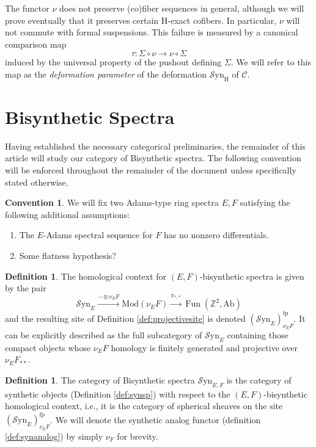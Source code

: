 \documentclass[10pt]{amsart}
\theoremstyle{definition}
\numberwithin{figure}{section}
\numberwithin{equation}{section}
\newtheorem{definition}[figure]{Definition}
\newtheorem{convention}[figure]{Convention}
\newcommand{\cC}{\mathcal{C}}
\theoremstyle{cited}
\newcommand{\bZ}{\mathbb{Z}}
\newcommand{\Fun}{\operatorname{Fun}}
\newcommand{\Ab}{\mathrm{Ab}}
\newcommand{\Mod}{\mathrm{Mod}}
\newcommand{\fp}{\mathrm{fp}}
\newcommand{\Syn}{\mathcal{S}\mathrm{yn}}
\renewcommand{\H}{\mathrm{H}}
\begin{document}
The functor $\nu$ does not preserve (co)fiber sequences in general, although we will prove eventually that it preserves certain $\H$-exact cofibers. In particular, $\nu$ will not commute with formal suspensions. This failure is measured by a canonical comparison map
\[
\tau: \Sigma \circ \nu \to \nu \circ \Sigma
\]
induced by the universal property of the pushout defining $\Sigma$. We will refer to this map as the \textit{deformation parameter} of the deformation $\Syn_\H$ of $\cC$. 


\section{Bisynthetic Spectra}

Having established the necessary categorical preliminaries, the remainder of this article will study our category of Bisynthetic spectra. The following convention will be enforced throughout the remainder of the document unless specifically stated otherwise. 

\begin{convention}
  We will fix two Adams-type ring spectra $E,F$ satisfying the following additional assumptions:
  \begin{enumerate}
      \item The $E$-Adams spectral sequence for $F$ has no nonzero differentials.
      \item Some flatness hypothesis?
  \end{enumerate}
\end{convention}

\begin{definition}
  The homological context for $(E,F)$-bisynthetic spectra is given by the pair
  \[
  \Syn_{E} \xrightarrow{-\otimes \nu_E F} \Mod(\nu_E F) \xrightarrow{\pi_{*,*}} \Fun(\bZ^2, \Ab)
  \]
  and the resulting site of Definition \ref{def:projectivesite} is denoted $(\Syn_E)_{\nu_E F}^\fp$. It can be explicitly described as the full subcategory of $\Syn_E$ containing those compact objects whose $\nu_E F$ homology is finitely generated and projective over $\nu_E F_{**}$.
\end{definition}

\begin{definition}
  The category of Bisynthetic spectra $\Syn_{E,F}$ is the category of synthetic objects (Definition \ref{def:synsp}) with respect to the $(E,F)$-bisynthetic homological context, i.e., it is the category of spherical sheaves on the site $(\Syn_E)_{\nu_E F}^\fp$. We will denote the synthetic analog functor (definition \ref{def:synanalog}) by simply $\nu_F$ for brevity.
\end{definition}
\end{document}
